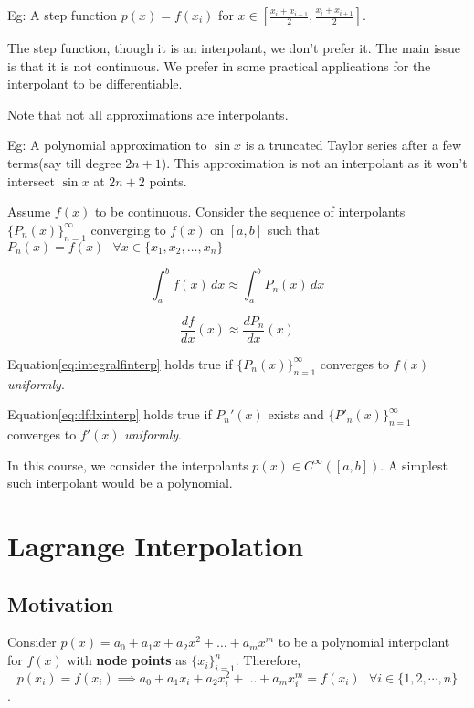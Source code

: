 \documentclass[
]{book}
\begin{document}
Eg: A step function \(p(x) = f(x_i)\) for \(x\in \left[ \frac{x_i+x_{i-1}}{2}, \frac{x_i+x_{i+1}}{2} \right]\).

The step function, though it is an interpolant, we don't prefer it. The main issue is that it is not continuous. We prefer in some practical applications for the interpolant to be differentiable.

Note that not all approximations are interpolants.

Eg: A polynomial approximation to \(\sin x\) is a truncated Taylor series after a few terms(say till degree \(2n+1\)). This approximation is not an interpolant as it won't intersect \(\sin x\) at \(2n+2\) points.

Assume \(f(x)\) to be continuous. Consider the sequence of interpolants \(\{P_n(x)\}_{n=1}^{\infty}\) converging to \(f(x)\) on \([a,b]\) such that \(P_n(x)=f(x) \ \  \ \forall x\in \{x_1,x_2,\dots,x_n \}\)

\begin{equation}
\label{eq:integralfinterp}
\int_a^b f(x) \, dx \approx \int_a^b P_n(x) \, dx 
\end{equation}

\begin{equation}
\label{eq:dfdxinterp}
\frac{df}{dx}(x) \approx \frac{dP_n}{dx}(x)
\end{equation}

Equation\eqref{eq:integralfinterp} holds true if \(\{P_n(x)\}_{n=1}^{\infty}\) converges to \(f(x)\) \emph{uniformly}.

Equation\eqref{eq:dfdxinterp} holds true if \(P_n'(x)\) exists and \(\{P'_n(x)\}_{n=1}^{\infty}\) converges to \(f'(x)\) \emph{uniformly}.

In this course, we consider the interpolants \(p(x) \in C^{\infty}([a,b])\). A simplest such interpolant would be a polynomial.

\hypertarget{lagrange-interpolation}{%
\section{Lagrange Interpolation}\label{lagrange-interpolation}}

\hypertarget{motivation}{%
\subsection{Motivation}\label{motivation}}

Consider \(p(x) = a_0+a_1x+a_2x^2+\dots+ a_mx^m\) to be a polynomial interpolant for \(f(x)\) with \textbf{node points} as \(\{x_i\}_{i=1}^n\). Therefore,
\[p(x_i)=f(x_i) \implies a_0+a_1x_i+a_2x_i^2+\dots+ a_mx_i^m = f(x_i) \ \ \ \forall i \in \{1,2,\cdots, n\}\].
\end{document}
